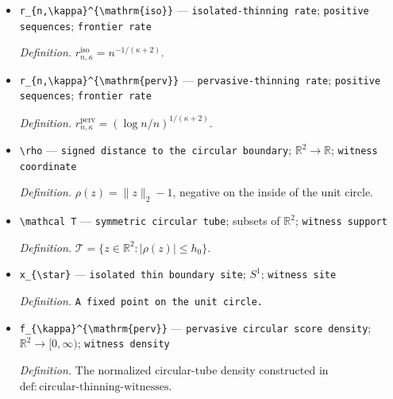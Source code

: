 \documentclass{article}
\begin{document}
\begin{itemize}
  \par\smallskip\noindent\emph{Definition.} The minimax risk constructed in \(\mathrm{def:expected\text{-}sup\text{-}risk}\).
  \item \texttt{r\_\allowbreak{}\{n,\allowbreak{}\textbackslash{}\allowbreak{}kappa\}\allowbreak{}\textasciicircum{}\{\textbackslash{}\allowbreak{}mathrm\{iso\}\allowbreak{}\}\allowbreak{}} --- \texttt{isolated-\allowbreak{}thinning rate}; \texttt{positive sequences}; \texttt{frontier rate}
  \par\smallskip\noindent\emph{Definition.} \(r_{n,\kappa}^{\mathrm{iso}}=n^{-1/(\kappa+2)}\).
  \item \texttt{r\_\allowbreak{}\{n,\allowbreak{}\textbackslash{}\allowbreak{}kappa\}\allowbreak{}\textasciicircum{}\{\textbackslash{}\allowbreak{}mathrm\{perv\}\allowbreak{}\}\allowbreak{}} --- \texttt{pervasive-\allowbreak{}thinning rate}; \texttt{positive sequences}; \texttt{frontier rate}
  \par\smallskip\noindent\emph{Definition.} \(r_{n,\kappa}^{\mathrm{perv}}=(\log n/n)^{1/(\kappa+2)}\).
  \item \texttt{\textbackslash{}\allowbreak{}rho} --- \texttt{signed distance to the circular boundary}; \(\mathbb R^2\to\mathbb R\); \texttt{witness coordinate}
  \par\smallskip\noindent\emph{Definition.} \(\rho(z)=\lVert z\rVert_2-1\), negative on the inside of the unit circle.
  \item \texttt{\textbackslash{}\allowbreak{}mathcal T} --- \texttt{symmetric circular tube}; subsets of \(\mathbb R^2\); \texttt{witness support}
  \par\smallskip\noindent\emph{Definition.} \(\mathcal T=\{z\in\mathbb R^2:|\rho(z)|\le h_0\}\).
  \item \texttt{x\_\allowbreak{}\{\textbackslash{}\allowbreak{}star\}\allowbreak{}} --- \texttt{isolated thin boundary site}; \(S^1\); \texttt{witness site}
  \par\smallskip\noindent\emph{Definition.} \texttt{A fixed point on the unit circle.}
  \item \texttt{f\_\allowbreak{}\{\textbackslash{}\allowbreak{}kappa\}\allowbreak{}\textasciicircum{}\{\textbackslash{}\allowbreak{}mathrm\{perv\}\allowbreak{}\}\allowbreak{}} --- \texttt{pervasive circular score density}; \(\mathbb R^2\to[0,\infty)\); \texttt{witness density}
  \par\smallskip\noindent\emph{Definition.} The normalized circular-tube density constructed in \(\mathrm{def:circular\text{-}thinning\text{-}witnesses}\).

\end{itemize}
\end{document}
